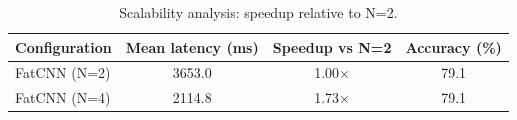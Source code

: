 \begin{table}[htbp]
\centering
\caption{Scalability analysis: speedup relative to N=2.}
\label{tab:scalability}
\begin{tabular}{lccc}
\toprule
Configuration & Mean latency (ms) & Speedup vs N=2 & Accuracy (\%) \\
\midrule
FatCNN (N=2) & 3653.0 & 1.00$\times$ & 79.1 \\
FatCNN (N=4) & 2114.8 & 1.73$\times$ & 79.1 \\
\bottomrule
\end{tabular}
\end{table}
